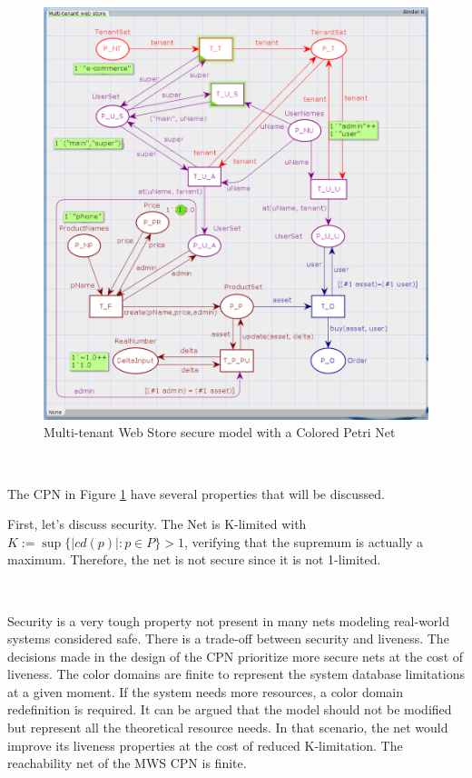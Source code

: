 \documentclass[12pt,english]{article} %
\begin{document}
\

\begin{figure}[H]
    \centering
    \includegraphics[scale=0.65]{img/mws/cpn/mws_cpn_secure_net.png}
    \caption{Multi-tenant Web Store secure model with a Colored Petri Net}
    \label{fig:mws-cpn-secure-net}
\end{figure}

\

The CPN in Figure \ref{fig:mws-cpn-secure-net} have several properties that will be discussed.

First, let's discuss security.
The Net is K-limited with $K:= \sup\{|cd(p)| : p\in P\} > 1$, verifying that the supremum is actually a maximum. 
Therefore, the net is not secure since it is not 1-limited.

\

Security is a very tough property not present in many nets modeling real-world systems considered safe.
There is a trade-off between security and liveness.
The decisions made in the design of the CPN prioritize more secure nets at the cost of liveness.
The color domains are finite to represent the system database limitations at a given moment.
If the system needs more resources, a color domain redefinition is required.
It can be argued that the model should not be modified but represent all the theoretical resource needs.
In that scenario, the net would improve its liveness properties at the cost of reduced K-limitation.
The reachability net of the MWS CPN is finite.
\end{document}

